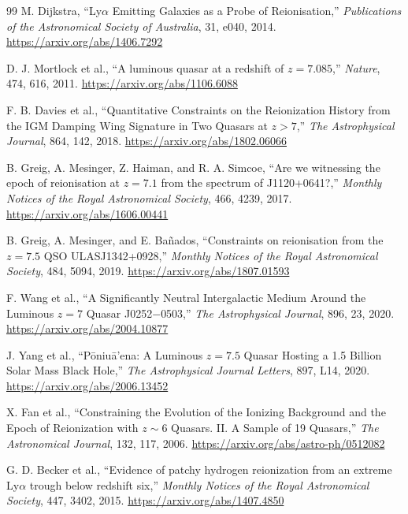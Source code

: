 \begin{thebibliography}{99}
M. Dijkstra,
``Ly$\alpha$ Emitting Galaxies as a Probe of Reionisation,''
\emph{Publications of the Astronomical Society of Australia}, 31, e040, 2014.
\url{https://arxiv.org/abs/1406.7292}

D. J. Mortlock et al.,
``A luminous quasar at a redshift of $z=7.085$,''
\emph{Nature}, 474, 616, 2011.
\url{https://arxiv.org/abs/1106.6088}

F. B. Davies et al.,
``Quantitative Constraints on the Reionization History from the IGM Damping Wing Signature in Two Quasars at $z>7$,''
\emph{The Astrophysical Journal}, 864, 142, 2018.
\url{https://arxiv.org/abs/1802.06066}

B. Greig, A. Mesinger, Z. Haiman, and R. A. Simcoe,
``Are we witnessing the epoch of reionisation at $z=7.1$ from the spectrum of J1120+0641?,''
\emph{Monthly Notices of the Royal Astronomical Society}, 466, 4239, 2017.
\url{https://arxiv.org/abs/1606.00441}

B. Greig, A. Mesinger, and E. Ba\~nados,
``Constraints on reionisation from the $z=7.5$ QSO ULASJ1342+0928,''
\emph{Monthly Notices of the Royal Astronomical Society}, 484, 5094, 2019.
\url{https://arxiv.org/abs/1807.01593}

F. Wang et al.,
``A Significantly Neutral Intergalactic Medium Around the Luminous $z=7$ Quasar J0252$-$0503,''
\emph{The Astrophysical Journal}, 896, 23, 2020.
\url{https://arxiv.org/abs/2004.10877}

J. Yang et al.,
``P\=oniu\=a'ena: A Luminous $z=7.5$ Quasar Hosting a 1.5 Billion Solar Mass Black Hole,''
\emph{The Astrophysical Journal Letters}, 897, L14, 2020.
\url{https://arxiv.org/abs/2006.13452}

X. Fan et al.,
``Constraining the Evolution of the Ionizing Background and the Epoch of Reionization with $z\sim6$ Quasars. II. A Sample of 19 Quasars,''
\emph{The Astronomical Journal}, 132, 117, 2006.
\url{https://arxiv.org/abs/astro-ph/0512082}

G. D. Becker et al.,
``Evidence of patchy hydrogen reionization from an extreme Ly$\alpha$ trough below redshift six,''
\emph{Monthly Notices of the Royal Astronomical Society}, 447, 3402, 2015.
\url{https://arxiv.org/abs/1407.4850}


\end{thebibliography}
